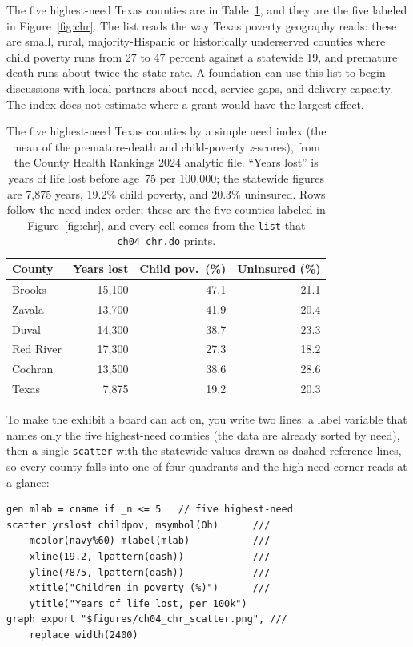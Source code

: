 \documentclass[
    a4paper,
    fontsize=10pt,
    twoside=true,
    numbers=noenddot,
]{kaobook}
\begin{document}
The five highest-need Texas counties are in Table~\ref{tab:chr}, and they are the five labeled in Figure~\ref{fig:chr}. The list reads the way Texas poverty geography reads: these are small, rural, majority-Hispanic or historically underserved counties where child poverty runs from 27 to 47 percent against a statewide 19, and premature death runs about twice the state rate. A foundation can use this list to begin discussions with local partners about need, service gaps, and delivery capacity. The index does not estimate where a grant would have the largest effect.

\begin{table}[htbp]
\centering
\caption[Five highest-need Texas counties]{The five highest-need Texas counties by a simple need index (the mean of the premature-death and child-poverty \emph{z}-scores), from the County Health Rankings 2024 analytic file. \enquote{Years lost} is years of life lost before age~75 per 100{,}000; the statewide figures are 7{,}875 years, 19.2\% child poverty, and 20.3\% uninsured. Rows follow the need-index order; these are the five counties labeled in Figure~\ref{fig:chr}, and every cell comes from the \texttt{list} that \texttt{ch04\_chr.do} prints.}
\label{tab:chr}
\begin{tabular}{lrrr}
\hline
County & Years lost & Child pov.\ (\%) & Uninsured (\%) \\
\hline
Brooks    & 15{,}100 & 47.1 & 21.1 \\
Zavala    & 13{,}700 & 41.9 & 20.4 \\
Duval     & 14{,}300 & 38.7 & 23.3 \\
Red River & 17{,}300 & 27.3 & 18.2 \\
Cochran   & 13{,}500 & 38.6 & 28.6 \\
\hline
Texas     &  7{,}875 & 19.2 & 20.3 \\
\hline
\end{tabular}
\end{table}

To make the exhibit a board can act on, you write two lines: a label variable that names only the five highest-need counties (the data are already sorted by need), then a single \texttt{scatter} with the statewide values drawn as dashed reference lines, so every county falls into one of four quadrants and the high-need corner reads at a glance:
\par
{\footnotesize
\begin{verbatim}
gen mlab = cname if _n <= 5   // five highest-need
scatter yrslost childpov, msymbol(Oh)      ///
    mcolor(navy%60) mlabel(mlab)           ///
    xline(19.2, lpattern(dash))            ///
    yline(7875, lpattern(dash))            ///
    xtitle("Children in poverty (%)")      ///
    ytitle("Years of life lost, per 100k")
graph export "$figures/ch04_chr_scatter.png", ///
    replace width(2400)
\end{verbatim}
}
\end{document}
